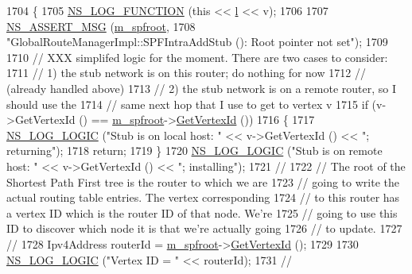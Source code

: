 \begin{DoxyCode}
1704 \{
1705   \hyperlink{log-macros-disabled_8h_a90b90d5bad1f39cb1b64923ea94c0761}{NS\_LOG\_FUNCTION} (\textcolor{keyword}{this} << \hyperlink{buildings__pathloss_8m_a5b54c0a045f179bcbbbc9abcb8b5cd4c}{l} << v);
1706 
1707   \hyperlink{assert_8h_aff5ece9066c74e681e74999856f08539}{NS\_ASSERT\_MSG} (\hyperlink{classns3_1_1GlobalRouteManagerImpl_a977f6b62ef1f1b58d041a2f49c093a1c}{m\_spfroot}, 
1708                  \textcolor{stringliteral}{"GlobalRouteManagerImpl::SPFIntraAddStub (): Root pointer not set"});
1709 
1710   \textcolor{comment}{// XXX simplifed logic for the moment.  There are two cases to consider:}
1711   \textcolor{comment}{// 1) the stub network is on this router; do nothing for now}
1712   \textcolor{comment}{//    (already handled above)}
1713   \textcolor{comment}{// 2) the stub network is on a remote router, so I should use the}
1714   \textcolor{comment}{// same next hop that I use to get to vertex v}
1715   \textcolor{keywordflow}{if} (v->GetVertexId () == \hyperlink{classns3_1_1GlobalRouteManagerImpl_a977f6b62ef1f1b58d041a2f49c093a1c}{m\_spfroot}->\hyperlink{classns3_1_1SPFVertex_addc1067d86f26e9fe3b2e34ed16f929c}{GetVertexId} ())
1716     \{
1717       \hyperlink{group__logging_ga88acd260151caf2db9c0fc84997f45ce}{NS\_LOG\_LOGIC} (\textcolor{stringliteral}{"Stub is on local host: "} << v->GetVertexId () << \textcolor{stringliteral}{"; returning"});
1718       \textcolor{keywordflow}{return};
1719     \}
1720   \hyperlink{group__logging_ga88acd260151caf2db9c0fc84997f45ce}{NS\_LOG\_LOGIC} (\textcolor{stringliteral}{"Stub is on remote host: "} << v->GetVertexId () << \textcolor{stringliteral}{"; installing"});
1721 \textcolor{comment}{//}
1722 \textcolor{comment}{// The root of the Shortest Path First tree is the router to which we are }
1723 \textcolor{comment}{// going to write the actual routing table entries.  The vertex corresponding}
1724 \textcolor{comment}{// to this router has a vertex ID which is the router ID of that node.  We're}
1725 \textcolor{comment}{// going to use this ID to discover which node it is that we're actually going}
1726 \textcolor{comment}{// to update.}
1727 \textcolor{comment}{//}
1728   Ipv4Address routerId = \hyperlink{classns3_1_1GlobalRouteManagerImpl_a977f6b62ef1f1b58d041a2f49c093a1c}{m\_spfroot}->\hyperlink{classns3_1_1SPFVertex_addc1067d86f26e9fe3b2e34ed16f929c}{GetVertexId} ();
1729 
1730   \hyperlink{group__logging_ga88acd260151caf2db9c0fc84997f45ce}{NS\_LOG\_LOGIC} (\textcolor{stringliteral}{"Vertex ID = "} << routerId);
1731 \textcolor{comment}{//}

\end{DoxyCode}
